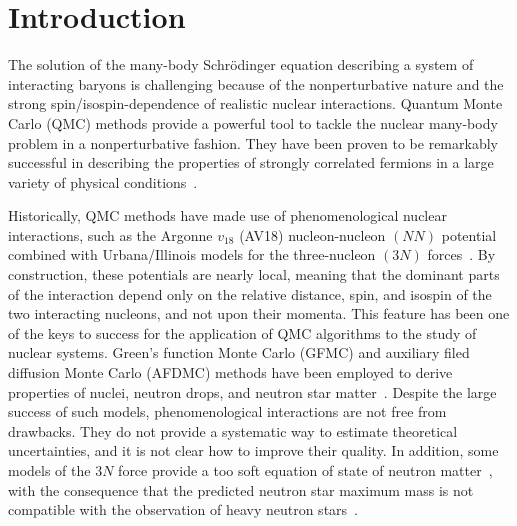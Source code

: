 \documentclass[aps,prc,twocolumn,superscriptaddress,floatfix]{revtex4-1}
\begin{document}
\maketitle

\section{Introduction}
\label{sec:intro}
The solution of the many-body Schr\"odinger equation describing a system of  
interacting baryons is challenging because of the nonperturbative 
nature and the strong spin/isospin-dependence of realistic nuclear interactions. 
Quantum Monte Carlo (QMC) methods provide a powerful tool to tackle the nuclear 
many-body problem in a nonperturbative fashion. They have been proven to be 
remarkably successful in describing the properties of strongly correlated 
fermions in a large variety of physical conditions~\cite{Carlson:2015}. 

Historically, QMC methods have made use of phenomenological nuclear interactions, 
such as the Argonne $v_{18}$ (AV18) nucleon-nucleon $(NN)$ potential combined
with Urbana/Illinois models for the three-nucleon $(3N)$ forces~\cite{Carlson:2015}.
By construction, these potentials are nearly local, meaning that the dominant parts 
of the interaction depend only on the relative distance, spin, and isospin of the
two interacting nucleons, and not upon their momenta.
This feature has been one of the keys to success
for the application of QMC algorithms to the study of nuclear systems. Green's function
Monte Carlo (GFMC) and auxiliary filed diffusion Monte Carlo (AFDMC) methods have been employed 
to derive properties of nuclei, neutron drops, and neutron star 
matter~\cite{Carlson:2015,Gandolfi:2011,Gandolfi:2012,Maris:2013,Gandolfi:2014,Gandolfi:2014_epja,Buraczynski:2016,Buraczynski:2017}.
Despite the large success of such models, phenomenological interactions are not free from
drawbacks. They do not provide a systematic way to estimate theoretical uncertainties, 
and it is not clear how to improve their quality. In addition, some models of the 
$3N$ force provide a too soft equation of state of neutron matter~\cite{Sarsa:2003,Maris:2013},
with the consequence that the predicted neutron star maximum mass is not compatible
with the observation of heavy neutron stars~\cite{Demorest:2010,Antoniadis:2013}.
\end{document}
